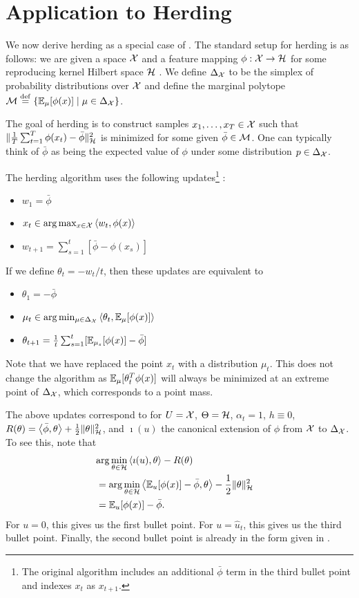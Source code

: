 \documentclass[paper.tex]{subfiles}
\begin{document}
\section{Application to Herding}
\label{sec:herding}

We now derive herding as a special case of \dual. The standard setup for herding is as follows: we are given a 
space $\mathcal{X}$ and a feature mapping $\phi : \mathcal{X} \to \mathcal{H}$ for some 
reproducing kernel Hilbert space $\mathcal{H}$ \cite{RKHS}. 
We define $\Delta_{\mathcal{X}}$ to be the simplex 
of probability distributions over $\mathcal{X}$ and define the marginal polytope 
$\mathcal{M} \stackrel{\mathrm{def}}{=} \{\mathbb{E}_{\mu}[\phi(x)] \mid \mu \in \Delta_{\mathcal{X}}\}$.

The goal of herding is to construct samples $x_1,\ldots,x_T \in \mathcal{X}$ 
such that $\|\frac{1}{T}\sum_{t=1}^T \phi(x_t)-\bar{\phi}\|_{\mathcal{H}}^2$ 
is minimized for some given $\bar{\phi} \in \mathcal{M}$. One can typically
think of $\bar \phi$ as being the expected value of $\phi$ under some 
distribution $p \in \Delta_{\mathcal{X}}$. 

The herding algorithm uses the following updates\footnote{The original 
algorithm includes an additional $\bar{\phi}$ term in the third bullet 
point and indexes $x_t$ as $x_{t+1}$.} \citep[][equations (1) and (2)]{Chen:2010a}:
\begin{itemize}
\item $w_1 = \bar{\phi}$
\item $x_t \in \arg\max_{x \in \mathcal{X}} \left\langle w_t, \phi(x) \right\rangle$
\item $w_{t+1} = \sum_{s=1}^t [\bar{\phi}-\phi(x_s)]$
\end{itemize}
If we define $\theta_t = -w_t/t$, then these updates are equivalent to
\begin{itemize}
\item $\theta_1 = -\bar{\phi}$
\item $\mu_t \in \arg\min_{\mu \in \Delta_{\mathcal{X}}} \left\langle \theta_t, \mathbb{E}_{\mu}[\phi(x)] \right\rangle$
\item $\theta_{t+1} = \frac{1}{t} \sum_{s=1}^t [\mathbb{E}_{\mu_s}[\phi(x)] - \bar{\phi}]$
\end{itemize}
Note that we have replaced the point $x_t$ with a distribution $\mu_t$. 
This does not change the algorithm as $\mathbb{E}_{\mu}[\theta_t^T\phi(x)]$ will 
always be minimized at an extreme point of $\Delta_{\mathcal{X}}$, which corresponds 
to a point mass.

The above updates correspond to \dual for $U = \mathcal{X}$, $\Theta = \mathcal{H}$, 
$\alpha_t = 1$, $h \equiv 0$, 
$R(\theta) = \left\langle \bar{\phi}, \theta \right\rangle + \frac{1}{2}\|\theta\|_{\mathcal{H}}^2$, 
and $\imath(u)$ the canonical extension of $\phi$ from $\mathcal{X}$ to $\Delta_{\mathcal{X}}$.
To see this, note that 
\begin{align}
\lefteqn{\arg\min_{\theta \in \sH} \ip{\imath(u)}{\theta} - R(\theta)} \\
 &= \arg\min_{\theta \in \sH} \ip{\bE_{u}[\phi(x)]-\bar{\phi}}{\theta} - \frac{1}{2}\|\theta\|_{\sH}^2 \\
 &= \bE_u[\phi(x)] - \bar{\phi}.
\end{align}
For $u = 0$, this gives us the first bullet point. For $u = \hat{u}_t$, 
this gives us the third bullet point. Finally, the second bullet point 
is already in the form given in \dual.
\end{document}
